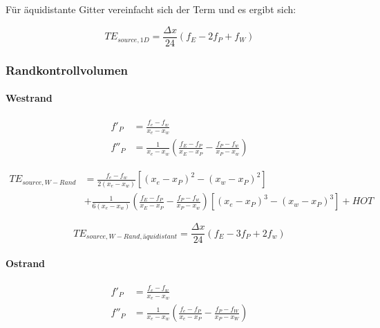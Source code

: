 Für äquidistante Gitter vereinfacht sich der Term und es ergibt sich:

\begin{equation*}
  TE_{source, 1D} = \frac{\Delta x}{24} \left({f_E-2f_P+f_W}\right)
\end{equation*}

\subsubsection{Randkontrollvolumen}

\paragraph{Westrand}



\begin{align*}
  f'_P &=\frac{f_e-f_w}{x_e-x_w}\\
  f''_P &= \frac{1}{x_e-x_w}\left(\frac{f_E-f_P}{x_E-x_P}-\frac{f_P-f_w}{x_P-x_w}\right)
\end{align*}

\begin{align}
  TE_{source, W-Rand} &=
 \frac{f_e-f_w}{2(x_e-x_w)}  \left[{(x_e-x_P)^2-(x_w-x_P)^2}\right]\nonumber\\
&+\frac{1}{6(x_e-x_w)}\left(\frac{f_E-f_P}{x_E-x_P}-\frac{f_P-f_w}{x_P-x_w}\right)
  \left[{{(x_e-x_P)}^3-{(x_w-x_P)}^3}\right] + HOT
\end{align}

\begin{equation*}
  TE_{source, W-Rand, äquidistant} = \frac{\Delta x}{24} \left({f_E-3f_P+2f_w}\right)
\end{equation*}


\paragraph{Ostrand}

\begin{align*}
  f'_P &=\frac{f_e-f_w}{x_e-x_w}\\
  f''_P &= \frac{1}{x_e-x_w}\left(\frac{f_e-f_P}{x_e-x_P}-\frac{f_P-f_W}{x_P-x_W}\right)
\end{align*}

